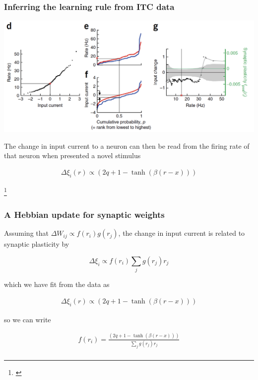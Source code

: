 \documentclass{beamer}
\begin{document}
\begin{frame}[plain]
\frametitle{Inferring the learning rule from ITC data}

\begin{center}
\includegraphics[scale=0.55]{learning-rules}
\end{center}

The change in input current to a neuron can then be read from the firing rate of that neuron when presented a novel stimulus

\begin{align*}
\Delta \xi_{i}(r) \propto (2q + 1 - \tanh (\beta (r-x)))
\end{align*}

\footnote{\cite{lim}}

\end{frame}

\begin{frame}[plain]
\frametitle{A Hebbian update for synaptic weights}

Assuming that $\Delta W_{ij} \propto f(r_{i})g(r_{j})$, the change in input current is related to synaptic plasticity by

\begin{equation*}
\Delta \xi_{i}  \propto  f(r_{i}) \sum_{j} g(r_{j})r_{j}
\end{equation*}

which we have fit from the data as 

\begin{align*}
\Delta \xi_{i}(r) \propto (2q + 1 - \tanh (\beta (r-x)))
\end{align*}

so we can write

\begin{align*}
f(r_{i}) =  \frac{(2q + 1 - \tanh (\beta (r-x)))}{\sum_{j} g(r_{j})r_{j}}\\
\end{align*}


\end{frame}
\end{document}
